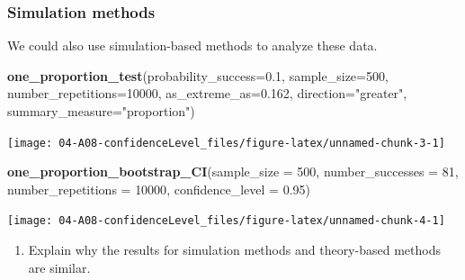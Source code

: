 \documentclass[
]{report}
\newenvironment{Shaded}{\begin{snugshade}}{\end{snugshade}}
\newcommand{\AttributeTok}[1]{\textcolor[rgb]{0.13,0.29,0.53}{#1}}
\newcommand{\DecValTok}[1]{\textcolor[rgb]{0.00,0.00,0.81}{#1}}
\newcommand{\FloatTok}[1]{\textcolor[rgb]{0.00,0.00,0.81}{#1}}
\newcommand{\FunctionTok}[1]{\textcolor[rgb]{0.13,0.29,0.53}{\textbf{#1}}}
\newcommand{\NormalTok}[1]{#1}
\newcommand{\StringTok}[1]{\textcolor[rgb]{0.31,0.60,0.02}{#1}}
\providecommand{\tightlist}{%
  \setlength{\itemsep}{0pt}\setlength{\parskip}{0pt}}
\begin{document}
\subsubsection*{Simulation methods}\label{simulation-methods}

We could also use simulation-based methods to analyze these data.

\begin{Shaded}
\begin{Highlighting}[]
\FunctionTok{one\_proportion\_test}\NormalTok{(}\AttributeTok{probability\_success=}\FloatTok{0.1}\NormalTok{,}
                    \AttributeTok{sample\_size=}\DecValTok{500}\NormalTok{,}
                    \AttributeTok{number\_repetitions=}\DecValTok{10000}\NormalTok{,}
                    \AttributeTok{as\_extreme\_as=}\FloatTok{0.162}\NormalTok{,}
                    \AttributeTok{direction=}\StringTok{"greater"}\NormalTok{,}
                    \AttributeTok{summary\_measure=}\StringTok{"proportion"}\NormalTok{)}
\end{Highlighting}
\end{Shaded}

\begin{center}\texttt{[image: 04-A08-confidenceLevel\_files/figure-latex/unnamed-chunk-3-1]} \end{center}

\begin{Shaded}
\begin{Highlighting}[]
\FunctionTok{one\_proportion\_bootstrap\_CI}\NormalTok{(}\AttributeTok{sample\_size =} \DecValTok{500}\NormalTok{,}
                            \AttributeTok{number\_successes =} \DecValTok{81}\NormalTok{,}
                            \AttributeTok{number\_repetitions =} \DecValTok{10000}\NormalTok{,}
                            \AttributeTok{confidence\_level =} \FloatTok{0.95}\NormalTok{)}
\end{Highlighting}
\end{Shaded}

\begin{center}\texttt{[image: 04-A08-confidenceLevel\_files/figure-latex/unnamed-chunk-4-1]} \end{center}

\begin{enumerate}
\def\labelenumi{\arabic{enumi}.}
\setcounter{enumi}{6}
\tightlist
\item
  Explain why the results for simulation methods and theory-based methods are similar.
\end{enumerate}
\end{document}
